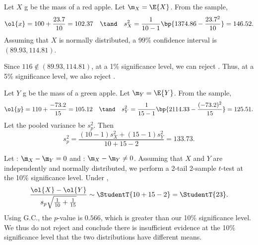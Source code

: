 \begin{solution}
    \begin{ppart}
        Let $X$ g be the mass of a red apple. Let $\m_X = \E{X}$. From the sample, \[\ol{x} = 100 + \frac{23.7}{10} = 102.37 \quad \tand \quad s_X^2 = \frac1{10-1} \bp{1374.86 - \frac{23.7^2}{10}} = 146.52.\] Assuming that $X$ is normally distributed, a 99\% confidence interval is $(89.93, 114.81)$.
    \end{ppart}
    \begin{ppart}
        Since $116 \notin (89.93, 114.81)$, at a 1\% significance level, we can reject \nullhyp. Thus, at a 5\% significance level, we also reject \nullhyp.
    \end{ppart}
    \begin{ppart}
        Let $Y$ g be the mass of a green apple. Let $\m_Y = \E{Y}$. From the sample, \[\ol{y} = 110 + \frac{-73.2}{15} = 105.12 \quad \tand \quad s_Y^2 = \frac1{15-1} \bp{2114.33 - \frac{(-73.2)^2}{15}} = 125.51.\] Let the pooled variance be $s_p^2$. Then \[s_p^2 = \frac{(10-1)s_X^2 + (15-1)s_Y^2}{10 + 15 - 2} = 133.73.\]
    \end{ppart}
    \begin{ppart}
        Let \nullhyp: $\m_X - \m_Y = 0$ and \althyp: $\m_X - \m_Y \neq 0$. Assuming that $X$ and $Y$ are independently and normally distributed, we perform a 2-tail 2-sample $t$-test at the 10\% significance level. Under \nullhyp, \[\frac{\ol{X} - \ol{Y}}{s_p \sqrt{\frac1{10} + \frac1{15}}} \sim \StudentT{10 + 15 - 2} = \StudentT{23}.\] Using G.C., the $p$-value is $0.566$, which is greater than our 10\% significance level. We thus do not reject \nullhyp{} and conclude there is insufficient evidence at the 10\% significance level that the two distributions have different means.
    \end{ppart}
\end{solution}

